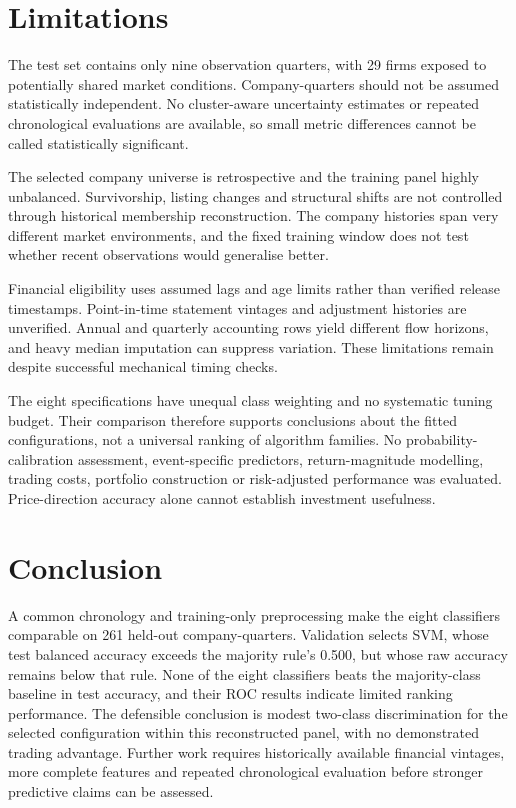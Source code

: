 \documentclass[letterpaper,10pt,conference]{ieeeconf}
\begin{document}
\section{Limitations}
The test set contains only nine observation quarters, with 29 firms exposed to potentially shared market conditions. Company-quarters should not be assumed statistically independent. No cluster-aware uncertainty estimates or repeated chronological evaluations are available, so small metric differences cannot be called statistically significant.

The selected company universe is retrospective and the training panel highly unbalanced. Survivorship, listing changes and structural shifts are not controlled through historical membership reconstruction. The company histories span very different market environments, and the fixed training window does not test whether recent observations would generalise better.

Financial eligibility uses assumed lags and age limits rather than verified release timestamps. Point-in-time statement vintages and adjustment histories are unverified. Annual and quarterly accounting rows yield different flow horizons, and heavy median imputation can suppress variation. These limitations remain despite successful mechanical timing checks.

The eight specifications have unequal class weighting and no systematic tuning budget. Their comparison therefore supports conclusions about the fitted configurations, not a universal ranking of algorithm families. No probability-calibration assessment, event-specific predictors, return-magnitude modelling, trading costs, portfolio construction or risk-adjusted performance was evaluated. Price-direction accuracy alone cannot establish investment usefulness.

\section{Conclusion}
A common chronology and training-only preprocessing make the eight classifiers comparable on 261 held-out company-quarters. Validation selects SVM, whose test balanced accuracy exceeds the majority rule's 0.500, but whose raw accuracy remains below that rule. None of the eight classifiers beats the majority-class baseline in test accuracy, and their ROC results indicate limited ranking performance. The defensible conclusion is modest two-class discrimination for the selected configuration within this reconstructed panel, with no demonstrated trading advantage. Further work requires historically available financial vintages, more complete features and repeated chronological evaluation before stronger predictive claims can be assessed.



\end{document}
